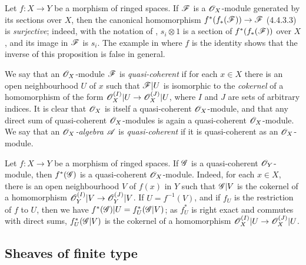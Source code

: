 \begin{env}[5.1.2]
\label{0.5.1.2}
Let $f:X\to Y$ be a morphism of ringed spaces.
If $\mathscr{F}$ is a $\mathscr{O}_X$-module generated by its sections over $X$, then the canonical homomorphism $f^*(f_*(\sh{F}))\to\sh{F}$ (4.4.3.3) is \emph{surjective};
indeed, with the notation of , $s_i\otimes 1$ is a section of $f^*(f_*(\mathscr{F}))$ over $X$, and its image in $\mathscr{F}$ is $s_i$.
The example in  where $f$ is the identity shows that the inverse of this proposition is false in general.

\end{env}

\begin{env}[5.1.3]
\label{0.5.1.3}
We say that an $\mathscr{O}_X$-module $\mathscr{F}$ is \emph{quasi-coherent} if for each $x\in X$ there is an open neighbourhood $U$ of $x$ such that $\mathscr{F}|U$ is isomorphic to the \emph{cokernel} of a homomorphism of the form $\sh{O}_X^{(I)}|U\to\sh{O}_X^{(J)}|U$, where $I$ and $J$ are sets of arbitrary indices.
It is clear that $\mathscr{O}_X$ is itself a quasi-coherent $\mathscr{O}_X$-module, and that any direct sum of quasi-coherent $\mathscr{O}_X$-modules is again a quasi-coherent $\mathscr{O}_X$-module.
We say that an \emph{$\mathscr{O}_X$-algebra $\mathscr{A}$} is \emph{quasi-coherent} if it is quasi-coherent as an $\mathscr{O}_X$-module.
\end{env}

\begin{env}[5.1.4]
\label{0.5.1.4}
Let $f:X\to Y$ be a morphism of ringed spaces.
If $\mathscr{G}$ is a quasi-coherent $\mathscr{O}_Y$-module, then $f^*(\mathscr{G})$ is a quasi-coherent $\mathscr{O}_X$-module.
Indeed, for each $x\in X$, there is an open neighbourhood $V$ of $f(x)$ in $Y$ such that $\mathscr{G}|V$ is the cokernel of a homomorphism $\sh{O}_Y^{(I)}|V\to\sh{O}_Y^{(J)}|V$.
If $U=f^{-1}(V)$, and if $f_U$ is the restriction of $f$ to $U$, then we have $f^*(\mathscr{G})|U=f_U^*(\mathscr{G}|V)$;
as $f_U^*$ is right exact and commutes with direct sums, $f_U^*(\mathscr{G}|V)$ is the cokernel of a homomorphism $\sh{O}_X^{(I)}|U\to\sh{O}_X^{(J)}|U$.
\end{env}

\subsection{Sheaves of finite type}
\label{subsection:0.5.2}


